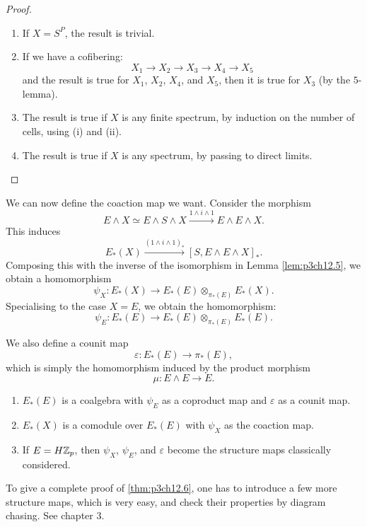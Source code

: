 \documentclass[../main]{subfiles}
\begin{document}
\begin{proof}

\begin{enumerate}
    \item If $X=S^P$, the result is trivial.
    \item If we have a cofibering:
    \[ X_1\longrightarrow X_2\longrightarrow X_3\longrightarrow X_4\longrightarrow X_5 \]
    and the result is true for $X_1$, $X_2$, $X_4$, and $X_5$, then it is true for $X_3$ (by the $5$-lemma).
    \item The result is true if $X$ is any finite spectrum, by induction on the number of cells, using (i) and (ii).
    \item The result is true if $X$ is any spectrum, by passing to direct limits.
\end{enumerate}

\end{proof}

We can now define the coaction map we want. Consider the morphism
\[ E\wedge X\simeq E\wedge S\wedge X\xrightarrow{1\wedge i\wedge 1}E\wedge E\wedge X . \]
This induces
\[ E_\ast(X)\xrightarrow{(1\wedge i\wedge 1)_\ast}[S,E\wedge E\wedge X]_\ast . \]
Composing this with the inverse of the isomorphism in Lemma \ref{lem:p3ch12.5}, we obtain a homomorphism
\[ \psi_X\colon E_\ast(X)\longrightarrow E_\ast(E)\otimes_{\pi_\ast(E)}E_\ast(X) . \]
Specialising to the case $X=E$, we obtain the homomorphism:
\[ \psi_E\colon E_\ast(E)\longrightarrow E_\ast(E)\otimes_{\pi_\ast(E)}E_\ast(E) . \]

We also define a counit map
\[ \varepsilon\colon E_\ast(E)\longrightarrow\pi_\ast(E) , \]
which is simply the homomorphism induced by the product morphism
\[ \mu\colon E\wedge E\longrightarrow E . \]

\begin{theorem} \label{thm:p3ch12.6}

\begin{enumerate}
    \item $E_\ast(E)$ is a coalgebra with $\psi_E$ as a coproduct map and $\varepsilon$ as a counit map.
    \item $E_\ast(X)$ is a comodule over $E_\ast(E)$ with $\psi_X$ as the coaction map.
    \item If $E=H\mathbb{Z}_p$, then $\psi_X$, $\psi_E$, and $\varepsilon$ become the structure maps classically considered.
\end{enumerate}

To give a complete proof of \ref{thm:p3ch12.6}, one has to introduce a few more structure maps, which is very easy, and check their properties by diagram chasing. See \cite{adams3} chapter 3.

\end{theorem}
\end{document}

